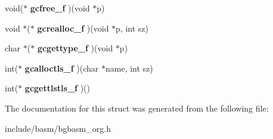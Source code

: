 \begin{DoxyCompactItemize}
\item 
\hypertarget{structBGBASM__GCFuncs__t_a003e5899134e1f99e7a33ceecbc86267}{void($\ast$ {\bfseries gcfree\-\_\-f} )(void $\ast$p)}\label{structBGBASM__GCFuncs__t_a003e5899134e1f99e7a33ceecbc86267}

\item 
\hypertarget{structBGBASM__GCFuncs__t_a26f5259097b5e44877800951ba903510}{void $\ast$($\ast$ {\bfseries gcrealloc\-\_\-f} )(void $\ast$p, int sz)}\label{structBGBASM__GCFuncs__t_a26f5259097b5e44877800951ba903510}

\item 
\hypertarget{structBGBASM__GCFuncs__t_a6544e5bde25012e80abe2f3336d92b81}{char $\ast$($\ast$ {\bfseries gcgettype\-\_\-f} )(void $\ast$p)}\label{structBGBASM__GCFuncs__t_a6544e5bde25012e80abe2f3336d92b81}

\item 
\hypertarget{structBGBASM__GCFuncs__t_a42674e896682546e7e22ac5074f86317}{int($\ast$ {\bfseries gcalloctls\-\_\-f} )(char $\ast$name, int sz)}\label{structBGBASM__GCFuncs__t_a42674e896682546e7e22ac5074f86317}

\item 
\hypertarget{structBGBASM__GCFuncs__t_a528566dc6e007f5c6884f749dc5fe64a}{int($\ast$ {\bfseries gcgettlstls\-\_\-f} )()}\label{structBGBASM__GCFuncs__t_a528566dc6e007f5c6884f749dc5fe64a}

\end{DoxyCompactItemize}


The documentation for this struct was generated from the following file\-:\begin{DoxyCompactItemize}
\item 
include/basm/bgbasm\-\_\-org.\-h\end{DoxyCompactItemize}
